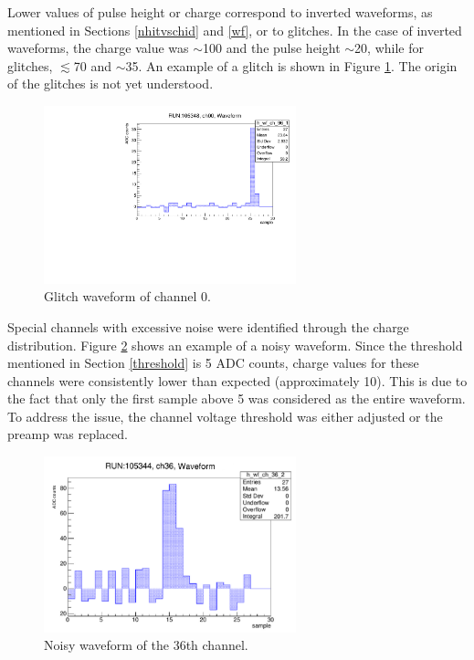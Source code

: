 Lower values of pulse height or charge correspond to inverted waveforms, as mentioned in Sections \ref{nhitvschid} and \ref{wf}, 
or to glitches. In the case of inverted waveforms, the charge value was $\sim$100 and the pulse height $\sim$20, while for glitches, $\lesssim$70 and $\sim$35. 
An example of a glitch is shown in Figure \ref{fig:glitches}. The origin of the glitches is not yet understood.
\begin{figure}[!h]
  \centering
  \includegraphics[width=0.65\textwidth]{figures/pdf/glitch.pdf}
  \caption{Glitch waveform of channel 0.}
  \label{fig:glitches}
\end{figure}
Special channels with excessive noise were identified through the charge distribution. 
Figure \ref{fig:noisywf} shows an example of a noisy waveform. 
Since the threshold mentioned in Section \ref{threshold} is 5 ADC counts, charge values for these channels were consistently lower than expected (approximately 10). 
This is due to the fact that only the first sample above 5 was considered as the entire waveform.
To address the issue, the channel voltage threshold was either adjusted or the preamp was replaced.
\begin{figure}[!h]
  \centering
  \includegraphics[width=0.65\textwidth]{figures/pdf/noise.pdf}
  \caption{Noisy waveform of the 36th channel.}
  \label{fig:noisywf}
\end{figure}

